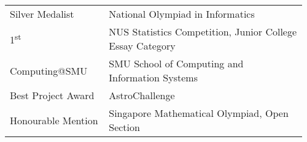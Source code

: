 \documentclass[a4paper,hidelinks]{resume} %
\begin{document}
\begin{minipage}[t]{0.54\textwidth}
    \sectionspace %
    
    
    
    \sectionspace %
    
    \begin{tabular}{p{0.32\linewidth} p{0.64\linewidth}}
        Silver Medalist & {National Olympiad in Informatics} \\
        1\textsuperscript{st} & {NUS Statistics Competition, Junior College Essay Category} \\
        Computing@SMU & {SMU School of Computing and Information Systems}\\
        Best Project Award & {AstroChallenge} \\
        Honourable Mention & {Singapore Mathematical Olympiad, Open Section}\\
    \end{tabular}
    
    \sectionspace %
    

\end{minipage} %
\end{document}
